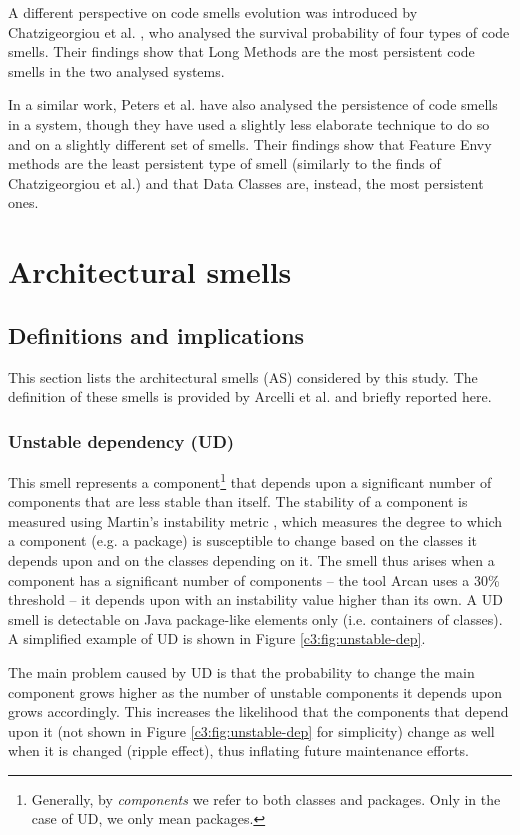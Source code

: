 A different perspective on code smells evolution was introduced by Chatzigeorgiou et al. \cite{Chatzigeorgiou2014}, who analysed the survival probability of four types of code smells. Their findings show that Long Methods are the most persistent code smells in the two analysed systems.

In a similar work, Peters et al. \cite{Peters2012} have also analysed the persistence of code smells in a system, though they have used a slightly less elaborate technique to do so and on a slightly different set of smells.
Their findings show that Feature Envy methods are the least persistent type of smell (similarly to the finds of Chatzigeorgiou et al.) and that Data Classes are, instead, the most persistent ones.

\section{Architectural smells}\label{c3:sec:arch-smells}
\subsection{Definitions and implications}
This section lists the architectural smells (AS) considered by this study. The definition of these smells is provided by Arcelli et al. \cite{Arcelli2016} and briefly reported here.
\subsubsection{Unstable dependency (UD)}\label{c3:sec:arch-smells-ud}
This smell represents a component\footnote{Generally, by \emph{components} we refer to both classes and packages. Only in the case of UD, we only mean packages.} that depends upon a significant number of components that are less stable than itself.
The stability of a component is measured using Martin's instability metric \cite{Martin2018}, which measures the degree to which a component (e.g. a package) is susceptible to change based on the classes it depends upon and on the classes depending on it.
The smell thus arises when a component has a significant number of components -- the tool Arcan uses a 30\% threshold \cite{Arcelli2017} -- it depends upon with an instability value higher than its own.
A UD smell is detectable on Java package-like elements only (i.e. containers of classes). A simplified example of UD is shown in Figure \ref{c3:fig:unstable-dep}. 

The main problem caused by UD is that the probability to change the main component grows higher as the number of unstable components it depends upon grows accordingly. This increases the likelihood that the components that depend upon it (not shown in Figure \ref{c3:fig:unstable-dep} for simplicity) change as well when it is changed (ripple effect), thus inflating future maintenance efforts.

